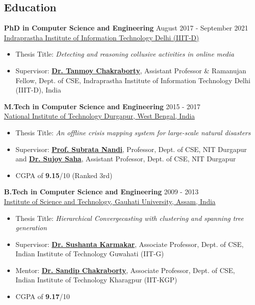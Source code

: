 \documentclass[margin, centered]{res}
\begin{document}
\begin{resume}
\section{Education}
\textbf{PhD in Computer Science and Engineering} \hfill August 2017 - September 2021 \\
\href{http://www.iiitd.ac.in/}{Indraprastha Institute of Information Technology Delhi (IIIT-D)}
\begin{itemize}
 \item Thesis Title: \textit{Detecting and reasoning collusive activities in online media}
 \item Supervisor: \href{https://sites.google.com/site/tanmoychakra88/}{\textbf{Dr. Tanmoy Chakraborty}}, Assistant Professor \& Ramanujan Fellow, Dept. of CSE, Indraprastha Institute of Information Technology Delhi (IIIT-D), India
\end{itemize}
\textbf{M.Tech in Computer Science and Engineering} \hfill 2015 - 2017 \\
\href{http://www.nitdgp.ac.in/}{National Institute of Technology Durgapur, West Bengal, India}
\begin{itemize}
 \item Thesis Title: \textit{An offline crisis mapping system for large-scale natural disasters}
 \item Supervisor: \href{http://www.nitdgp.ac.in/cse/s_nandi/s_nandi.php}{\textbf{Prof. Subrata Nandi}}, Professor, Dept. of CSE, NIT Durgapur and \href{http://www.nitdgp.ac.in/cse/s_saha/s_saha.php}{\textbf{Dr. Sujoy Saha}}, Assistant Professor, Dept. of CSE, NIT Durgapur
 \item CGPA of \textbf{9.15}/10 (Ranked 3rd)
\end{itemize}
\textbf{B.Tech in Computer Science and Engineering} \hfill 2009 - 2013 \\
\href{http://www.gauhati.ac.in/}{Institute of Science and Technology, Gauhati University, Assam, India}
\begin{itemize}
 \item Thesis Title: \textit{Hierarchical Convergecasting with clustering and spanning tree generation}
 \item Supervisor: \href{https://www.iitg.ac.in/sushantak/}{\textbf{Dr. Sushanta Karmakar}}, Associate Professor, Dept. of CSE, Indian Institute of Technology Guwahati (IIT-G)
 \item Mentor: \href{http://cse.iitkgp.ac.in/~sandipc/}{\textbf{Dr. Sandip Chakraborty}}, Associate Professor, Dept. of CSE, Indian Institute of Technology Kharagpur (IIT-KGP)
 \item CGPA of \textbf{9.17}/10
\end{itemize}
 

\end{resume}
\end{document}
